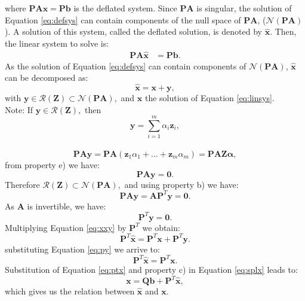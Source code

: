 \documentclass[12pt]{article}
\numberwithin{equation}{section}
\begin{document}
where $\mathbf{P}\mathbf{A}\mathbf{x}=\mathbf{P}\mathbf{b}$ is the deflated system. Since 
$\mathbf{P}\mathbf{A}$ is singular, the solution of Equation \eqref{eq:defsys} can contain
components of the null space of $\mathbf{P}\mathbf{A}$, ($\mathcal{N}(\mathbf{P}\mathbf{A})$). A solution of this system, called the deflated
solution, is denoted by $\mathbf{\hat{x}}$. Then, the linear system to solve is:\\
\begin{align}\label{eq:defsys}
\mathbf{P}\mathbf{A}\hat{\mathbf{x}}&=\mathbf{P}\mathbf{b}.
\end{align}
As the solution of Equation \eqref{eq:defsys} can contain components of 
$\mathcal{N}(\mathbf{P}\mathbf{A})$,
$\mathbf{\hat{x}}$ can be decomposed as:
\begin{equation}\label{eq:xxy}
\mathbf{\hat{x}}=\mathbf{x}+ \mathbf{y},
\end{equation}
with $\mathbf{y} \in \mathcal{R}(\mathbf{Z})\subset \mathcal{N}(\mathbf{P}\mathbf{A}),$ 
and $\mathbf{x}$ the solution of Equation \eqref{eq:linsys}.\\
Note: If $\mathbf{y} \in \mathcal{R}(\mathbf{Z}),$ then $$\mathbf{y}=\sum^{m}_{i=1}\alpha_i \mathbf{z}_i,$$\\
 \begin{equation*}\label{eq:paz}
 \mathbf{P}\mathbf{A}\mathbf{y} =\mathbf{P}\mathbf{A}(\mathbf{z}_1\alpha_1 +...+ \mathbf{z}_m\alpha_m)=\mathbf{P}\mathbf{A}\mathbf{Z}\mathbf{\alpha},\end{equation*}
 from property e) we have:
 \begin{equation*}\label{eq:pay}
 \mathbf{P}\mathbf{A}\mathbf{y}=\mathbf{0}.
 \end{equation*}
Therefore $\mathcal{R}(\mathbf{Z})\subset \mathcal{N}(\mathbf{P}\mathbf{A}),$ and using property b) we have:
 \begin{equation*}
 \mathbf{P}\mathbf{A}\mathbf{y}=\mathbf{A}\mathbf{P}^T\mathbf{y}=\mathbf{0}.
 \end{equation*}
 As $\mathbf{A}$ is invertible, we have:
  \begin{equation}\label{eq:py}
\mathbf{P}^T\mathbf{y}=\mathbf{0}.
 \end{equation}
 Multiplying Equation \eqref{eq:xxy} by $\mathbf{P}^T$ we obtain:
$$\mathbf{P}^T\mathbf{\hat{x}}=\mathbf{P}^T\mathbf{x}+\mathbf{P}^T\mathbf{y}.$$
substituting Equation \eqref{eq:py} we arrive to:
  \begin{equation}\label{eq:ptx}
\mathbf{P}^T\mathbf{\hat{x}}=\mathbf{P}^T\mathbf{x}.
 \end{equation}
Substitution of Equation \eqref{eq:ptx} and property c) in Equation \eqref{eq:splx} leads to:
\begin{equation}\label{eq:xfromxh1}
    \mathbf{x}=\mathbf{Q}\mathbf{b}+\mathbf{P}^T\mathbf{\hat{x}}, 
\end{equation}
which gives us the relation between $\mathbf{\hat{x}}$ and $\mathbf{x}$.
% 
\end{document}
